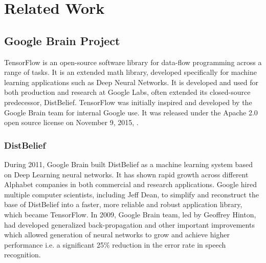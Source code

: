 
\chapter{Related Work} %
\label{Chapter3} %


\section{Google Brain Project}
TensorFlow is an open-source software library for data-flow programming across a range of tasks. It is an extended math library, developed specifically for machine learning applications such as Deep Neural Networks.\cite{Reference28} It is developed and used for both production and research at Google Labs, often extended its closed-source predecessor, DistBelief.
TensorFlow was initially inspired and developed by the Google Brain team for internal Google use. It was released under the Apache 2.0 open source license on November 9, 2015, \cite{Reference29}. 

\subsection{DistBelief}
During 2011, Google Brain built DistBelief as a machine learning system based on Deep Learning neural networks. It has shown rapid growth across different Alphabet companies in both commercial and research applications. Google hired multiple computer scientists, including Jeff Dean, to simplify and reconstruct the base of DistBelief into a faster, more reliable and robust application library, which became TensorFlow. In 2009, Google Brain team, led by Geoffrey Hinton, had developed generalized back-propagation and other important improvements which allowed generation of neural networks to grow and achieve higher performance i.e. a significant 25\% reduction in the error rate in speech recognition.



